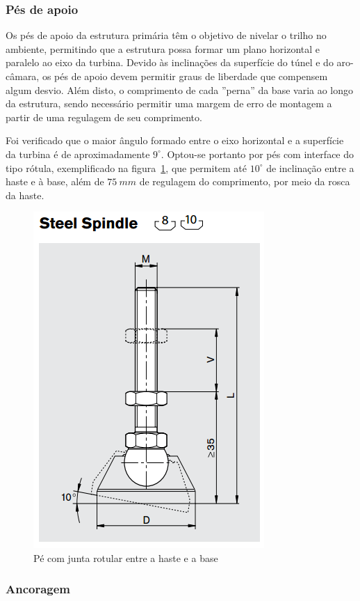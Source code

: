\subsubsection{Pés de apoio}

Os pés de apoio da estrutura primária têm o objetivo de nivelar o trilho no
ambiente, permitindo que a estrutura possa formar um plano horizontal e paralelo
ao eixo da turbina. Devido às inclinações da superfície do túnel e do
aro-câmara, os pés de apoio devem permitir graus de liberdade que compensem
algum desvio. Além disto, o comprimento de cada ''perna'' da base varia ao
longo da estrutura, sendo necessário permitir uma margem de erro de
montagem a partir de uma regulagem de seu comprimento.

Foi verificado que o maior ângulo formado entre o eixo horizontal e a superfície
da turbina é de aproximadamente $9^{\circ}$. Optou-se portanto por pés com
interface do tipo rótula, exemplificado na figura~\ref{fig::spindle}, que
permitem até $10^{\circ}$ de inclinação entre a haste e à base, além de $75~mm$ de regulagem
do comprimento, por meio da rosca da haste. %

\begin{figure}[h!]
	\centering
	\includegraphics[width=0.4\columnwidth]{figs/construcao/spindle}
	\caption{Pé com junta rotular entre a haste e a base}
    \label{fig::spindle}
\end{figure}

\subsubsection{Ancoragem}

